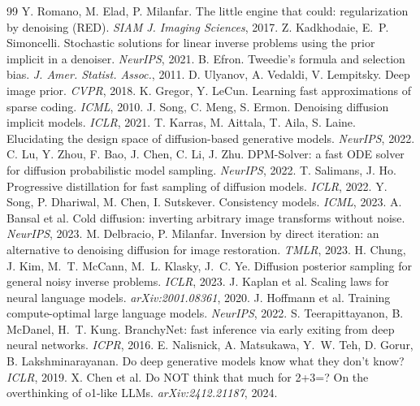 \documentclass[letterpaper]{article}
\begin{document}
\begin{thebibliography}{99}
 Y. Romano, M. Elad, P. Milanfar. The little engine that could: regularization by denoising (RED). \emph{SIAM J. Imaging Sciences}, 2017.
 Z. Kadkhodaie, E.~P. Simoncelli. Stochastic solutions for linear inverse problems using the prior implicit in a denoiser. \emph{NeurIPS}, 2021.
 B. Efron. Tweedie's formula and selection bias. \emph{J. Amer. Statist. Assoc.}, 2011.
 D. Ulyanov, A. Vedaldi, V. Lempitsky. Deep image prior. \emph{CVPR}, 2018.
 K. Gregor, Y. LeCun. Learning fast approximations of sparse coding. \emph{ICML}, 2010.
 J. Song, C. Meng, S. Ermon. Denoising diffusion implicit models. \emph{ICLR}, 2021.
 T. Karras, M. Aittala, T. Aila, S. Laine. Elucidating the design space of diffusion-based generative models. \emph{NeurIPS}, 2022.
 C. Lu, Y. Zhou, F. Bao, J. Chen, C. Li, J. Zhu. DPM-Solver: a fast ODE solver for diffusion probabilistic model sampling. \emph{NeurIPS}, 2022.
 T. Salimans, J. Ho. Progressive distillation for fast sampling of diffusion models. \emph{ICLR}, 2022.
 Y. Song, P. Dhariwal, M. Chen, I. Sutskever. Consistency models. \emph{ICML}, 2023.
 A. Bansal et al. Cold diffusion: inverting arbitrary image transforms without noise. \emph{NeurIPS}, 2023.
 M. Delbracio, P. Milanfar. Inversion by direct iteration: an alternative to denoising diffusion for image restoration. \emph{TMLR}, 2023.
 H. Chung, J. Kim, M.~T. McCann, M.~L. Klasky, J.~C. Ye. Diffusion posterior sampling for general noisy inverse problems. \emph{ICLR}, 2023.
 J. Kaplan et al. Scaling laws for neural language models. \emph{arXiv:2001.08361}, 2020.
 J. Hoffmann et al. Training compute-optimal large language models. \emph{NeurIPS}, 2022.
 S. Teerapittayanon, B. McDanel, H.~T. Kung. BranchyNet: fast inference via early exiting from deep neural networks. \emph{ICPR}, 2016.
 E. Nalisnick, A. Matsukawa, Y.~W. Teh, D. Gorur, B. Lakshminarayanan. Do deep generative models know what they don't know? \emph{ICLR}, 2019.
 X. Chen et al. Do NOT think that much for 2+3=? On the overthinking of o1-like LLMs. \emph{arXiv:2412.21187}, 2024.
\end{thebibliography}
\end{document}
